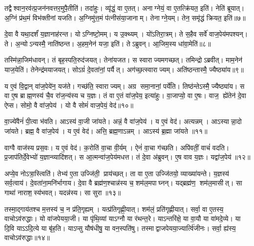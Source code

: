 तद्वैश्वान॒रव॑त्प्र॒जन॑नवत्तर॒मुपै॒तीति॑। तदा॑हुः। व्यृ॑द्धं॒ वा ए॒तत्। अनाग्नेयं॒ वा ए॒तत्क्रि॑यत॒ इति॑। नेति॑ ब्रूयात्। अ॒ग्निं प्र॑थ॒मं विभ॑क्तीनां यजति। अ॒ग्निमु॑त्त॒मं प॑त्नीसंया॒जानाम्। तेनाग्ने॒यम्। तेन॒ समृ॑द्धं क्रियत॒ इति॑॥७॥\anuvakamend[अ॒रु॒न्ध॒तै॒व तद्भ॑वति॒ सम्भृ॑तसम्भार॒ इत्या॑हुरि॒च्छति॑ पत्नीसंया॒जा नव॑ च]

दे॒वा वै यथा॒दर्\mbox{}शं॑ य॒ज्ञानाह॑रन्त। योऽग्निष्टो॒मम्। य उ॒क्थ्यम्। यो॑ऽतिरा॒त्रम्। ते स॒हैव सर्वे॑ वाज॒पेय॑मपश्यन्। ते। अ॒न्योऽन्यस्मै॒ नाति॑ष्ठन्त। अ॒हम॒नेन॑ यजा॒ इति॑। तेऽब्रुवन्। आ॒जिम॒स्य धा॑वा॒मेति॑॥८॥

तस्मि॑न्ना॒जिम॑धावन्। तं बृह॒स्पति॒रुद॑जयत्। तेना॑यजत। स स्वाराज्यमगच्छत्। तमिन्द्रोऽब्रवीत्। माम॒नेन॑ याज॒येति॑। तेनेन्द्र॑मयाजयत्। सोऽग्रं॑ दे॒वता॑नां॒ पर्यैत्। अग॑च्छ॒त्स्वाराज्यम्। अति॑ष्ठन्तास्मै॒ ज्यैष्ठ्या॑य॥९॥

य ए॒वं वि॒द्वान् वा॑ज॒पेये॑न॒ यज॑ते। गच्छ॑ति॒ स्वाराज्यम्। अग्र समा॒नानां॒ पर्ये॑ति। तिष्ठ॑न्तेऽस्मै॒ ज्यैष्ठ्या॑य। स वा ए॒ष ब्राह्म॒णस्य॑ चै॒व रा॑ज॒न्य॑स्य च य॒ज्ञः। तं वा ए॒तं वा॑ज॒पेय॒ इत्या॑हुः। वा॒जाप्यो॒ वा ए॒षः। वाज॒ ह्ये॑तेन॑ दे॒वा ऐप्स\sn{}। सोमो॒ वै वा॑ज॒पेय॑। यो वै सोमं॑ वाज॒पेयं॒ वेद॑॥१०॥

वा॒ज्ये॑वैनं॑ पी॒त्वा भ॑वति। आऽस्य॑ वा॒जी जा॑यते। अन्नं॒ वै वा॑ज॒पेय॑। य ए॒वं वेद॑। अत्यन्नम्। आऽस्यान्ना॒दो जा॑यते। ब्रह्म॒ वै वा॑ज॒पेय॑। य ए॒वं वेद॑। अत्ति॒ ब्रह्म॒णाऽन्नम्। आऽस्य॑ ब्र॒ह्मा जा॑यते ॥११॥

वाग्वै वाज॑स्य प्रस॒वः। य ए॒वं वेद॑। क॒रोति॑ वा॒चा वी॒र्यम्। ऐनं॑ वा॒चा ग॑च्छति। अपि॑वतीं॒ वाचं॑ वदति। प्र॒जाप॑तिर्दे॒वेभ्यो॑ य॒ज्ञान्व्यादि॑शत्। स आ॒त्मन्वा॑ज॒पेय॑मधत्त। तं दे॒वा अ॑ब्रुवन्। ए॒ष वाव य॒ज्ञः। यद्वा॑ज॒पेय॑॥१२॥

अप्ये॒व नोऽत्रा॒स्त्विति॑। तेभ्य॑ ए॒ता उज्जि॑ती॒ प्राय॑च्छत्। ता वा ए॒ता उज्जि॑तयो॒ व्याख्या॑यन्ते। य॒ज्ञस्य॑ सर्व॒त्वाय॑। दे॒वता॑ना॒मनि॑र्भागाय। दे॒वा वै ब्रह्म॑ण॒श्चान्न॑स्य च॒ शम॑ल॒मपाघ्नन्। यद्ब्रह्म॑ण॒ शम॑ल॒मासीत्। सा गाथा॑ नाराश॒स्य॑भवत्। यदन्न॑स्य। सा सुरा॥१३॥

तस्मा॒द्गाय॑तश्च म॒त्तस्य॑ च॒ न प्र॑ति॒गृह्यम्। यत्प्र॑तिगृह्णी॒यात्। शम॑लं॒ प्रति॑गृह्णीयात्। सर्वा॒ वा ए॒तस्य॒ वाचोऽव॑रुद्धाः। यो वा॑जपेयया॒जी। या पृ॑थि॒व्यां याऽग्नौ या र॑थन्त॒रे। याऽन्तरि॑क्षे॒ या वा॒यौ या वा॑मदे॒व्ये। या दि॒वि याऽऽदि॒त्ये या बृ॑ह॒ति। याऽप्सु यौष॑धीषु॒ या वन॒स्पति॑षु। तस्माद्वाजपेयया॒ज्यार्त्वि॑जीनः। सर्वा॒ ह्य॑स्य॒ वाचोऽव॑रुद्धाः॥१४॥\anuvakamend[धा॒वा॒मेति॒ ज्यैष्ठ्या॑य॒ वेद॑ ब्र॒ह्मा जा॑यते वाज॒पेय॒ सुराऽऽर्त्वि॑जीन॒ एकं॑ च]

